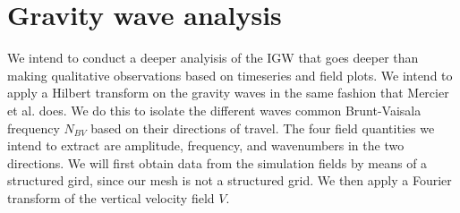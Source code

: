 \section{Gravity wave analysis}
\label{section:IGW_analysis}
We intend to conduct a deeper analyisis of the IGW that goes deeper than making qualitative observations based on timeseries and field plots. We intend to apply a Hilbert transform on the gravity waves in the same fashion that Mercier et al. \cite{mercier_reflection_2008} does. We do this to isolate the different waves common Brunt-Vaisala frequency $N_{BV}$ based on their directions of travel. The four field quantities we intend to extract are amplitude, frequency, and wavenumbers in the two directions. We will first obtain data from the simulation fields by means of a structured gird, since our mesh is not a structured grid. We then apply a Fourier transform of the vertical velocity field $V$.